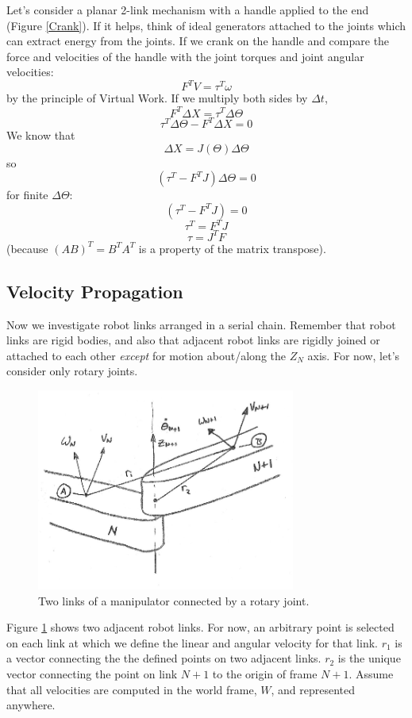 Let's consider a planar 2-link mechanism with a handle applied to the end (Figure \ref{Crank}).
If it helps, think of ideal generators attached to the joints which can extract energy from the joints.
If we crank on the
handle and compare the force and velocities of the handle with the joint torques and joint
angular velocities:
\[
F^TV = \tau^T \omega
\]
by the principle of Virtual Work.  If we multiply both sides by $\Delta t$,
\[
F^T\Delta X = \tau^T\Delta \Theta
\]
\[
\tau^T\Delta \Theta - F^T\Delta X = 0
\]
We know that
\[
\Delta X = J(\Theta) \Delta \Theta
\]
so
\[
\left( \tau^T - F^TJ \right ) \Delta \Theta = 0
\]
for finite $\Delta \Theta$:
\[
(\tau^T-F^TJ) = 0
\]
\[
\tau^T = F^T J
\]
\[
\tau = J^T F
\]
(because $(AB)^T = B^TA^T$ is a property of the matrix transpose).




\subsection{Velocity Propagation}

Now we investigate robot links arranged in a serial chain.  Remember that robot links are rigid bodies, and also
that adjacent robot links are rigidly joined or attached to each other {\it except} for motion
about/along the $Z_N$ axis.  For now, let's consider only rotary joints.


\begin{figure}\centering
\includegraphics[width=85mm]{figs05/00611.eps}
\caption{Two links of a manipulator connected by a rotary joint.}\label{linkjointlink}
\end{figure}

Figure \ref{linkjointlink} shows two adjacent robot links.
For now, an arbitrary point is selected on
each link at which we define the linear and angular velocity for that link.
$r_1$ is a vector connecting the the defined points on two adjacent links.  $r_2$ is the unique
vector connecting the point on link $N+1$ to the origin of frame $N+1$.
Assume that all velocities are computed in the world frame,
$W$, and represented anywhere.

